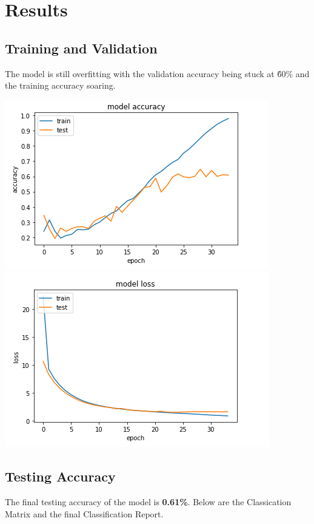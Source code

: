 \documentclass{article}
\begin{document}
    \section{Results}

    \subsection{Training and Validation}

    The model is still overfitting with the validation accuracy being stuck at \~60\% and the training accuracy soaring.

    \begin{center}
        \includegraphics[scale=0.5]{acc}
        \includegraphics[scale=0.5]{loss}
    \end{center}

    \subsection{Testing Accuracy}

    The final testing accuracy of the model is \textbf{0.61\%}. Below are the Classication Matrix and the final
    Classification Report.
\end{document}
